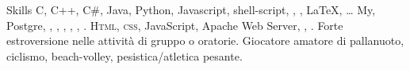 
\begin{rubric}{Skills}
	C, C++, C\#, Java, Python, Javascript, shell-script, , , \LaTeX, \ldots
\entry*[Databases]
	My, Postgre, , , , , , .
	\textsc{Html, css}, JavaScript, Apache Web Server,  , .
\entry*[Teamwork]
    Forte estroversione nelle attività di gruppo o oratorie.
\entry*[Sport]
    Giocatore amatore di pallanuoto, ciclismo, beach-volley, pesistica/atletica pesante.
\end{rubric}
